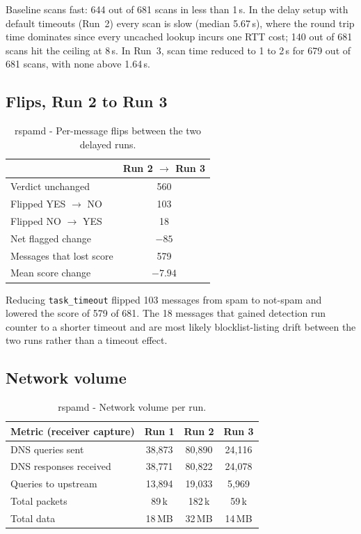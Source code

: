 Baseline scans fast: 644 out of 681 scans in less than 1\,s. In the delay setup with
default timeouts (Run~2) every scan is slow (median 5.67\,s), where the round trip time
dominates since every uncached lookup incurs one RTT cost; 140 out of 681 scans
hit the ceiling at 8\,s. In Run~3, scan time reduced to 1 to
2\,s for 679 out of 681 scans, with none above 1.64\,s.

\subsection{Flips, Run 2 to Run 3}

\begin{table}[H]\centering
\small
\begin{tabular}{@{}lc@{}}
\toprule
 & Run 2 $\to$ Run 3 \\
\midrule
Verdict unchanged        & 560 \\
Flipped YES $\to$ NO     & 103 \\
Flipped NO $\to$ YES     & 18 \\
Net flagged change       & $-85$ \\
Messages that lost score & 579 \\
Mean score change        & $-7.94$ \\
\bottomrule
\end{tabular}
\caption{rspamd - Per-message flips between the two delayed runs.}
\label{tab:rspamd-flips}
\end{table} 
Reducing \texttt{task\_timeout} flipped 103 messages from spam to not-spam and
lowered the score of 579 of 681. The 18 messages that gained detection run
counter to a shorter timeout and are most likely blocklist-listing drift between
the two runs rather than a timeout effect.

\subsection{Network volume}

\begin{table}[H]\centering
\small
\begin{tabular}{@{}lccc@{}}
\toprule
Metric (receiver capture) & Run 1 & Run 2 & Run 3 \\
\midrule
DNS queries sent          & 38{,}873 & 80{,}890 & 24{,}116 \\
DNS responses received    & 38{,}771 & 80{,}822 & 24{,}078 \\
Queries to upstream       & 13{,}894 & 19{,}033 & 5{,}969 \\
Total packets             & 89\,k & 182\,k & 59\,k \\
Total data                & 18\,MB & 32\,MB & 14\,MB \\
\bottomrule
\end{tabular}
\caption{rspamd - Network volume per run.}
\label{tab:rspamd-network}
\end{table}

